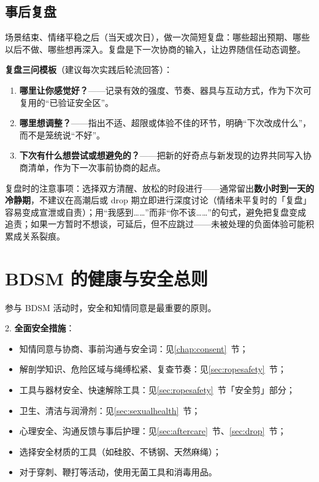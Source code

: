 \documentclass[12pt,UTF8]{ctexbook}
\begin{document}
\subsection{事后复盘}

场景结束、情绪平稳之后（当天或次日），做一次简短复盘：哪些超出预期、哪些以后不做、哪些想再深入。复盘是下一次协商的输入，让边界随信任动态调整。

\textbf{复盘三问模板}（建议每次实践后轮流回答）：

\begin{enumerate}
\item \textbf{哪里让你感觉好？}——记录有效的强度、节奏、器具与互动方式，作为下次可复用的“已验证安全区”。
\item \textbf{哪里想调整？}——指出不适、超限或体验不佳的环节，明确“下次改成什么”，而不是笼统说“不好”。
\item \textbf{下次有什么想尝试或想避免的？}——把新的好奇点与新发现的边界共同写入协商清单，作为下一次事前协商的起点。
\end{enumerate}

复盘时的注意事项：选择双方清醒、放松的时段进行——通常留出\textbf{数小时到一天的冷静期}，不建议在高潮后或 drop 期立即进行深度讨论（情绪未平复时的「复盘」容易变成宣泄或自责）；用“我感到……”而非“你不该……”的句式，避免把复盘变成追责；如果一方暂时不想谈，可延后，但不应跳过——未被处理的负面体验可能积累成关系裂痕。


\section{BDSM 的健康与安全总则}

参与 BDSM 活动时，安全和知情同意是最重要的原则。

2. \textbf{全面安全措施}：
\begin{itemize}
\item 知情同意与协商、事前沟通与安全词：见\ref{chap:consent}~节；
\item 解剖学知识、危险区域与绳缚松紧、复查节奏：见\ref{sec:ropesafety}~节；
\item 工具与器材安全、快速解除工具：见\ref{sec:ropesafety}~节「安全剪」部分；
\item 卫生、清洁与润滑剂：见\ref{sec:sexualhealth}~节；
\item 心理安全、沟通反馈与事后护理：见\ref{sec:aftercare}~节、\ref{sec:drop}~节；
\item 选择安全材质的工具（如硅胶、不锈钢、天然麻绳）；
\item 对于穿刺、鞭打等活动，使用无菌工具和消毒用品。
\end{itemize}
\end{document}
